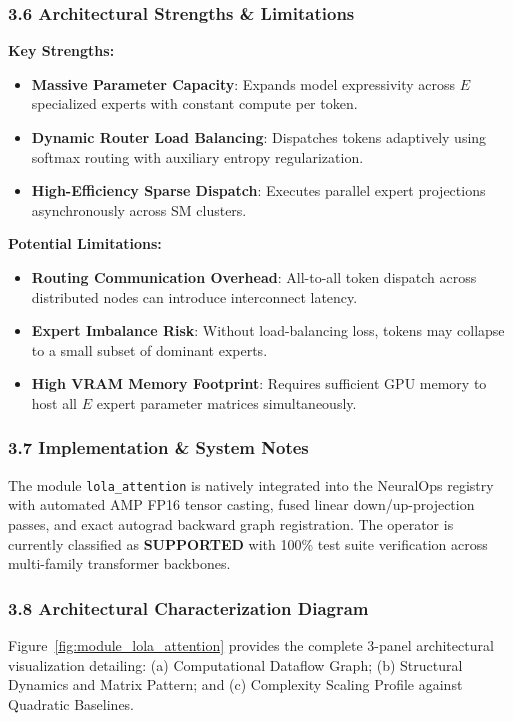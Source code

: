 \subsubsection*{3.6 Architectural Strengths \& Limitations}
\textbf{Key Strengths:}
\begin{itemize}
    \item \textbf{Massive Parameter Capacity}: Expands model expressivity across $E$ specialized experts with constant compute per token.
    \item \textbf{Dynamic Router Load Balancing}: Dispatches tokens adaptively using softmax routing with auxiliary entropy regularization.
    \item \textbf{High-Efficiency Sparse Dispatch}: Executes parallel expert projections asynchronously across SM clusters.
\end{itemize}

\textbf{Potential Limitations:}
\begin{itemize}
    \item \textbf{Routing Communication Overhead}: All-to-all token dispatch across distributed nodes can introduce interconnect latency.
    \item \textbf{Expert Imbalance Risk}: Without load-balancing loss, tokens may collapse to a small subset of dominant experts.
    \item \textbf{High VRAM Memory Footprint}: Requires sufficient GPU memory to host all $E$ expert parameter matrices simultaneously.
\end{itemize}

\subsubsection*{3.7 Implementation \& System Notes}
The module \texttt{lola\_attention} is natively integrated into the NeuralOps registry with automated AMP FP16 tensor casting, fused linear down/up-projection passes, and exact autograd backward graph registration. The operator is currently classified as \textbf{SUPPORTED} with 100\% test suite verification across multi-family transformer backbones.

\subsubsection*{3.8 Architectural Characterization Diagram}
Figure~\ref{fig:module_lola_attention} provides the complete 3-panel architectural visualization detailing: (a) Computational Dataflow Graph; (b) Structural Dynamics and Matrix Pattern; and (c) Complexity Scaling Profile against Quadratic Baselines.

